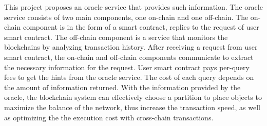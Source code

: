 This project proposes an oracle service that provides such information. The
oracle service consists of two main components, one on-chain and one off-chain.
The on-chain component is in the form of a smart contract, replies to the
request of user smart contract. The off-chain component is a service that
monitors the blockchains by analyzing transaction history. After receiving a
request from user smart contract, the on-chain and off-chain components
communicate to extract the necessary information for the request. User smart
contract pays per-query fees to get the hints from the oracle service. The cost
of each query depends on the amount of information returned. With the
information provided by the oracle, the blockchain system can effectively choose
a partition to place objects to maximize the balance of the network, thus
increase the transaction speed, as well as optimizing the the execution cost
with cross-chain transactions.



